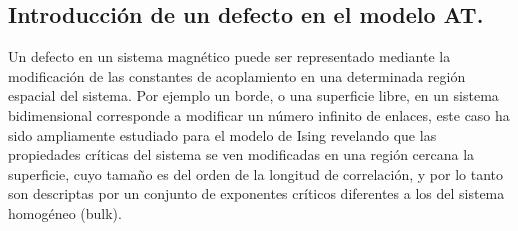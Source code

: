 \subsection{Introducción de un defecto en el modelo AT.}
\label{sec:AT_line}

 
Un defecto en un sistema magnético puede ser representado mediante la modificación de las constantes de acoplamiento en una determinada región espacial del sistema.
Por ejemplo un borde, o una superficie libre, en un sistema bidimensional corresponde a modificar un número infinito de enlaces, este caso ha sido ampliamente estudiado
para el modelo de Ising revelando que las propiedades críticas del sistema se ven modificadas en una región cercana la superficie, cuyo tamaño es del orden de la
 longitud de correlación, y por lo tanto son descriptas por un conjunto de exponentes críticos diferentes a los del sistema homogéneo (bulk).\\
 

